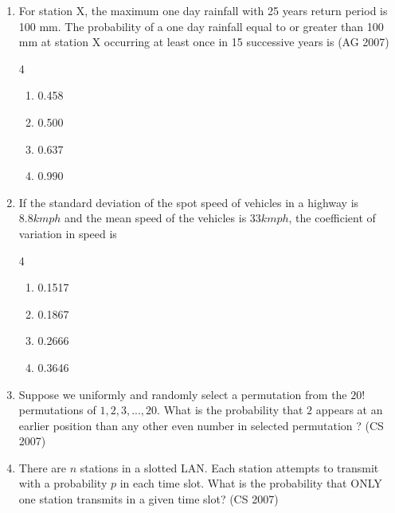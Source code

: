 \begin{enumerate}[label=\thesubsection.\arabic*,ref=\thesubsection.\theenumi]
\item  For station X, the maximum one day rainfall with 25 years return period is 100 mm.
The probability of a one day rainfall equal to or greater than 100 mm at station X occurring at least once in 15 successive years is
\hfill(AG 2007)
\begin{multicols}{4}
\begin{enumerate}
  \item 0.458
  \item 0.500
  \item 0.637
  \item 0.990
\end{enumerate}
\end{multicols}
\item If the standard deviation of the spot speed of vehicles in a highway is $8.8 kmph$ and the mean speed of the vehicles is $33 kmph$, the coefficient of variation in speed is
\hfill{}
\begin{multicols}{4}
\begin{enumerate}
\item 0.1517
\item 0.1867
\item 0.2666
\item 0.3646
\end{enumerate}
\end{multicols}
\item Suppose we uniformly and randomly select a permutation from the $20!$ permutations of $1,2,3,...,20.$ What is the probability that $2$ appears at an earlier position than any other even number  in selected permutation ?
\hfill {(CS 2007)}
\begin{enumerate}
\end{enumerate}
    \item There are $n$ stations in a slotted LAN. Each station attempts to transmit with a probability $p$ in each time slot. What is the probability that {ONLY} one station transmits in a given time slot?  
\hfill {(CS 2007)}
    \begin{enumerate}
    \end{enumerate}


\end{enumerate}
